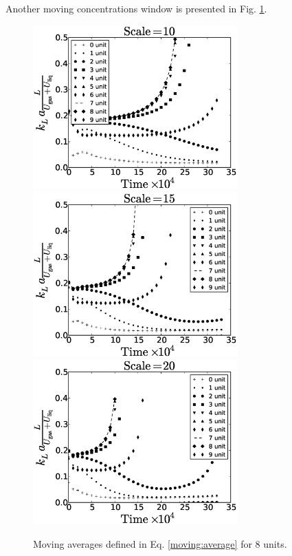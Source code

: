 \documentclass{article}
\begin{document}
Another moving concentrations window is presented in Fig. \ref{fig:moving:average:window10}.
\begin{figure}[htb!]
\includegraphics[width=0.7\textwidth]{Figures/aver_moving_window10scale10.eps}\\
\includegraphics[width=0.7\textwidth]{Figures/aver_moving_window10scale15.eps}\\
\includegraphics[width=0.7\textwidth]{Figures/aver_moving_window10scale20.eps}\\
\caption{Moving averages defined in Eq. \ref{moving:average} for $8$ units.
\label{fig:moving:average:window10}}
\end{figure}
\end{document}
